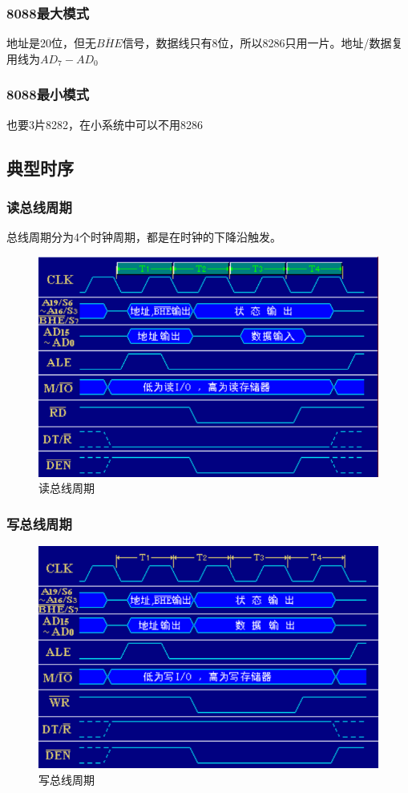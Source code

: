 \subsubsection{8088最大模式}
地址是20位，但无$\overline{BHE}$信号，数据线只有8位，所以8286只用一片。地址/数据复用线为$AD_7-AD_0$
\subsubsection{8088最小模式}
也要3片8282，在小系统中可以不用8286
\subsection{典型时序}
\subsubsection{读总线周期}
总线周期分为4个时钟周期，都是在时钟的下降沿触发。
\begin{figure}[H]
    \centering
    \includegraphics[scale=1]{part_8086CPU/part_8086CPU_pic/读总线周期.png}
    \caption{读总线周期}
\end{figure}
\subsubsection{写总线周期}
\begin{figure}[H]
    \centering
    \includegraphics[scale=1]{part_8086CPU/part_8086CPU_pic/写总线周期.png}
    \caption{写总线周期}
\end{figure}
